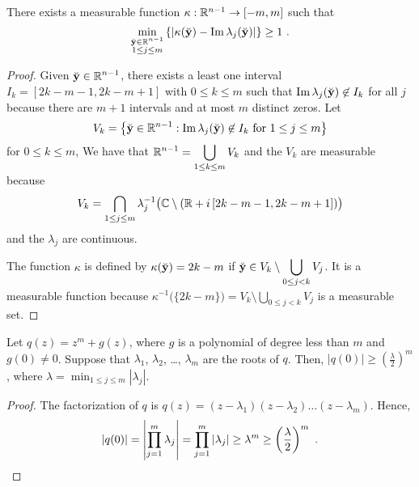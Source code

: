 \begin{lemma} \label{distr_lPDE3_ex2}
There exists a measurable function $\kappa:\mathbb{R}^{n-1}\rightarrow [-m,m]$
such that
\[
\min_{\substack{\breve{\mathbf{y}} \in \mathbb{R}^{n-1}\\ 1\leq j \leq m}}
\left\{ \left|\kappa(\breve{\mathbf{y}})
- \operatorname{Im} \lambda_j(\breve{\mathbf{y}})\right| \right\} \geq 1 \ .
\]
\end{lemma}

\begin{proof}
Given $\displaystyle \breve{\mathbf{y}} \in \mathbb{R}^{n-1}$, there exists a
least one interval
$\displaystyle I_k = [2k-m-1, 2k-m+1]$ with $0\leq k \leq m$ such that
$\operatorname{Im} \lambda_j(\breve{\mathbf{y}}) \not\in I_k$ for all $j$ because there
are $m+1$ intervals and at most $m$ distinct zeros.  Let
\[
V_k = \left\{ \breve{\mathbf{y}} \in \mathbb{R}^{n-1} :
\operatorname{Im} \lambda_j(\breve{\mathbf{y}}) \not\in I_k \ \text{for} \ 1 \leq j
\leq m \right\}
\]
for $0 \leq k \leq m$,  We have that
$\displaystyle \mathbb{R}^{n-1} = \bigcup_{1\leq k \leq m} V_k$ and
the $V_k$ are measurable because
\[
V_k = \bigcap_{1\leq j \leq m} \lambda_j^{-1}\big(\mathbb{C} \setminus
(\mathbb{R} + i\,[2k-m-1,2k-m+1])\big)
\]
and the $\lambda_j$ are continuous.

The function $\kappa$ is defined by
$\displaystyle \kappa(\breve{\mathbf{y}}) = 2k-m$ if
$\displaystyle \breve{\mathbf{y}} \in V_k \setminus \bigcup_{0\leq j<k} V_j$.
It is a measurable function because
$\displaystyle \kappa^{-1}\big(\{2k-m\}\big)
= V_k \setminus \bigcup_{0\leq j<k} V_j$
is a measurable set.
\end{proof}

\begin{lemma} \label{distr_lPDE3_ex3}
Let $\displaystyle q(z) = z^m + g(z)$, where $g$ is a polynomial of
degree less than $m$ and $g(0) \neq 0$.  Suppose that $\lambda_1$,
$\lambda_2$, \ldots, $\lambda_m$ are the roots of $q$.  Then,
$\displaystyle \left| q(0)\right| \geq \left(\frac{\lambda}{2}\right)^m$,
where $\displaystyle \lambda = \min_{1\leq j\leq m} |\lambda_j|$.
\end{lemma}

\begin{proof}
The factorization of $q$ is
$\displaystyle q(z) = (z-\lambda_1)(z-\lambda_2)\ldots(z-\lambda_m)$.
Hence,
\[
\left| q(0) \right| = \left| \prod_{j=1}^m \lambda_j \right|
= \prod_{j=1}^m \left| \lambda_j \right| \geq
\lambda^m \geq \left(\frac{\lambda}{2}\right)^m \ .  \qedhere
\]
\end{proof}

